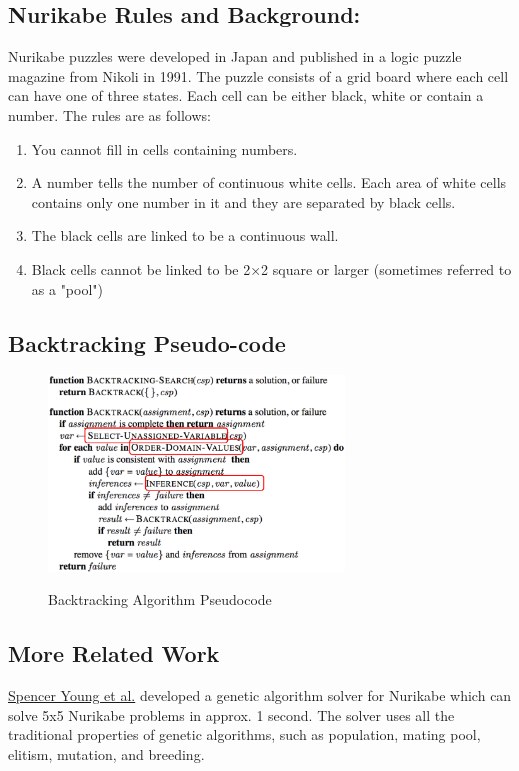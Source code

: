 \documentclass{article}
\theoremstyle{definition}
\begin{document}
\subsection{Nurikabe Rules and Background:}
Nurikabe puzzles were developed in Japan and published in a logic puzzle magazine from Nikoli in 1991. The puzzle consists of a grid board where each cell can have one of three states. Each cell can be either black, white or contain a number. The rules are as follows: 
\begin{enumerate}
    \item You cannot fill in cells containing numbers.
    \item A number tells the number of continuous white cells. Each area of white cells contains only one number in it and they are separated by black cells.
    \item The black cells are linked to be a continuous wall.
    \item Black cells cannot be linked to be 2×2 square or larger (sometimes referred to as a "pool")
\end{enumerate}


\subsection{Backtracking Pseudo-code}
\begin{figure}[H]
    \centering
    \includegraphics[width=0.7\textwidth]{backtracking.png} \\
    \caption{Backtracking Algorithm Pseudocode}
\end{figure}

\subsection{More Related Work}
\hyperlink{http://www.spenceryoungcs.com/nurikabeGA.html}{Spencer Young et al.} \cite{Young} developed a genetic algorithm solver for Nurikabe which can solve 5x5 Nurikabe problems in approx. 1 second. The solver uses all the traditional properties of genetic algorithms, such as population, mating pool, elitism, mutation, and breeding.
\end{document}
